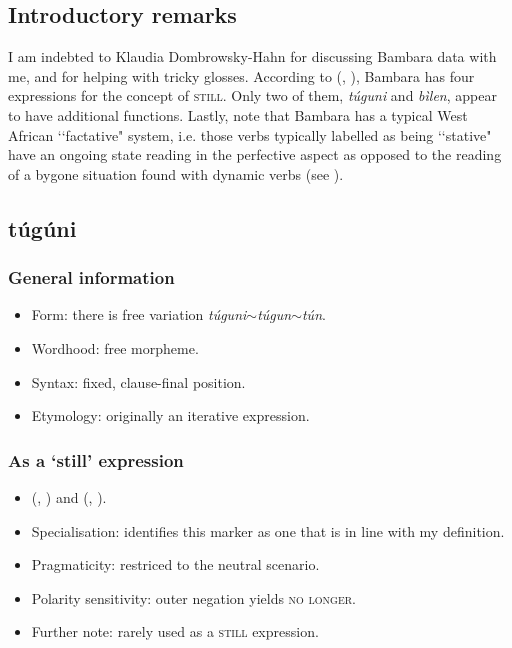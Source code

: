 \subsection{Introductory remarks} I am indebted to Klaudia Dombrowsky\hyp Hahn for discussing Bambara data with me, and for helping with tricky glosses. According to \citeauthor{DombrowskyHahn2020} (\citeyear{DombrowskyHahn2020}, \citeyear{DombrowskyHahn2021}), Bambara has four expressions for the concept of \textsc{still}. Only two of them, \textit{túguni} and \textit{bìlen}, appear to have additional functions. Lastly, note that Bambara has a typical West African \lq\lq factative" \parencite[346–347]{Welmers1973} system, i.e. those verbs typically labelled as being \lq\lq stative" have an ongoing state reading in the perfective aspect  as opposed to the reading of a bygone situation found with dynamic verbs (see \cite{HewsonBambara}).

\subsection{túgúni}

\subsubsection{General information}
\begin{itemize}
	\item Form: there is free variation \textit{túguni}$\sim$\textit{túgun}$\sim$\textit{tún}.
	 \item Wordhood: free morpheme.
	 \item Syntax: fixed, clause-final position.
	 \item Etymology: originally an iterative expression.
\end{itemize}


\subsubsection{As a  \lq still\rq{ }expression}
\begin{itemize}
	\item \citeauthor{Dumestre2003} (\citeyear[327]{Dumestre2003}, \citeyear[1003]{Dumestre2011}) and \citeauthor{DombrowskyHahn2020} (\citeyear{DombrowskyHahn2020}, \citeyear{DombrowskyHahn2021}).
	\item Specialisation: \textcite{DombrowskyHahn2021} identifies this marker as one that is in line with my definition. 
	\item Pragmaticity: restriced to the neutral scenario.
	\item Polarity sensitivity: outer negation yields \textsc{no longer}.
	\item Further note: rarely used as a \textsc{still} expression.
\end{itemize}

